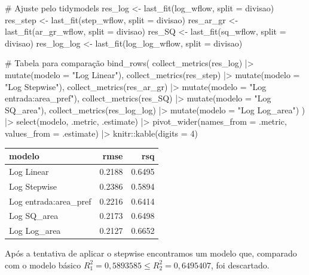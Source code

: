 \documentclass[
  letterpaper,
  DIV=11,
  numbers=noendperiod]{scrartcl}
\newenvironment{Shaded}{\begin{snugshade}}{\end{snugshade}}
\newcommand{\AttributeTok}[1]{\textcolor[rgb]{0.40,0.45,0.13}{#1}}
\newcommand{\CommentTok}[1]{\textcolor[rgb]{0.37,0.37,0.37}{#1}}
\newcommand{\DecValTok}[1]{\textcolor[rgb]{0.68,0.00,0.00}{#1}}
\newcommand{\FunctionTok}[1]{\textcolor[rgb]{0.28,0.35,0.67}{#1}}
\newcommand{\NormalTok}[1]{\textcolor[rgb]{0.00,0.23,0.31}{#1}}
\newcommand{\OtherTok}[1]{\textcolor[rgb]{0.00,0.23,0.31}{#1}}
\newcommand{\SpecialCharTok}[1]{\textcolor[rgb]{0.37,0.37,0.37}{#1}}
\newcommand{\StringTok}[1]{\textcolor[rgb]{0.13,0.47,0.30}{#1}}
\newcounter{none} %
\begin{document}
\begin{Shaded}
\begin{Highlighting}[]
\CommentTok{\# Ajuste pelo tidymodels}
\NormalTok{res\_log  }\OtherTok{\textless{}{-}} \FunctionTok{last\_fit}\NormalTok{(log\_wflow, }\AttributeTok{split =}\NormalTok{ divisao)}
\NormalTok{res\_step }\OtherTok{\textless{}{-}} \FunctionTok{last\_fit}\NormalTok{(step\_wflow, }\AttributeTok{split =}\NormalTok{ divisao)}
\NormalTok{res\_ar\_gr }\OtherTok{\textless{}{-}} \FunctionTok{last\_fit}\NormalTok{(ar\_gr\_wflow, }\AttributeTok{split =}\NormalTok{ divisao)}
\NormalTok{res\_SQ }\OtherTok{\textless{}{-}} \FunctionTok{last\_fit}\NormalTok{(sq\_wflow, }\AttributeTok{split =}\NormalTok{ divisao)}
\NormalTok{res\_log\_log }\OtherTok{\textless{}{-}} \FunctionTok{last\_fit}\NormalTok{(log\_log\_wflow, }\AttributeTok{split =}\NormalTok{ divisao)}

\CommentTok{\# Tabela para comparação}
\FunctionTok{bind\_rows}\NormalTok{(}
  \FunctionTok{collect\_metrics}\NormalTok{(res\_log)  }\SpecialCharTok{|\textgreater{}} \FunctionTok{mutate}\NormalTok{(}\AttributeTok{modelo =} \StringTok{"Log Linear"}\NormalTok{),}
  \FunctionTok{collect\_metrics}\NormalTok{(res\_step) }\SpecialCharTok{|\textgreater{}} \FunctionTok{mutate}\NormalTok{(}\AttributeTok{modelo =} \StringTok{"Log Stepwise"}\NormalTok{),}
  \FunctionTok{collect\_metrics}\NormalTok{(res\_ar\_gr) }\SpecialCharTok{|\textgreater{}} \FunctionTok{mutate}\NormalTok{(}\AttributeTok{modelo =} \StringTok{"Log entrada:area\_pref"}\NormalTok{),}
  \FunctionTok{collect\_metrics}\NormalTok{(res\_SQ) }\SpecialCharTok{|\textgreater{}} \FunctionTok{mutate}\NormalTok{(}\AttributeTok{modelo =} \StringTok{"Log SQ\_area"}\NormalTok{),}
  \FunctionTok{collect\_metrics}\NormalTok{(res\_log\_log) }\SpecialCharTok{|\textgreater{}} \FunctionTok{mutate}\NormalTok{(}\AttributeTok{modelo =} \StringTok{"Log Log\_area"}\NormalTok{)}
\NormalTok{) }\SpecialCharTok{|\textgreater{}}
  \FunctionTok{select}\NormalTok{(modelo, .metric, .estimate) }\SpecialCharTok{|\textgreater{}}
  \FunctionTok{pivot\_wider}\NormalTok{(}\AttributeTok{names\_from =}\NormalTok{ .metric, }\AttributeTok{values\_from =}\NormalTok{ .estimate) }\SpecialCharTok{|\textgreater{}}
\NormalTok{  knitr}\SpecialCharTok{::}\FunctionTok{kable}\NormalTok{(}\AttributeTok{digits =} \DecValTok{4}\NormalTok{)}
\end{Highlighting}
\end{Shaded}

{\def\LTcaptype{none} %
\begin{longtable}[]{@{}lrr@{}}
\toprule\noalign{}
modelo & rmse & rsq \\
\midrule\noalign{}
\endhead
\bottomrule\noalign{}
\endlastfoot
Log Linear & 0.2188 & 0.6495 \\
Log Stepwise & 0.2386 & 0.5894 \\
Log entrada:area\_pref & 0.2216 & 0.6414 \\
Log SQ\_area & 0.2173 & 0.6498 \\
Log Log\_area & 0.2127 & 0.6652 \\
\end{longtable}
}

Após a tentativa de aplicar o stepwise encontramos um modelo que,
comparado com o modelo básico
\(R^2_1 = 0{,}5893585 \leq R^2_2 =  0,6495407\), foi descartado.
\end{document}
